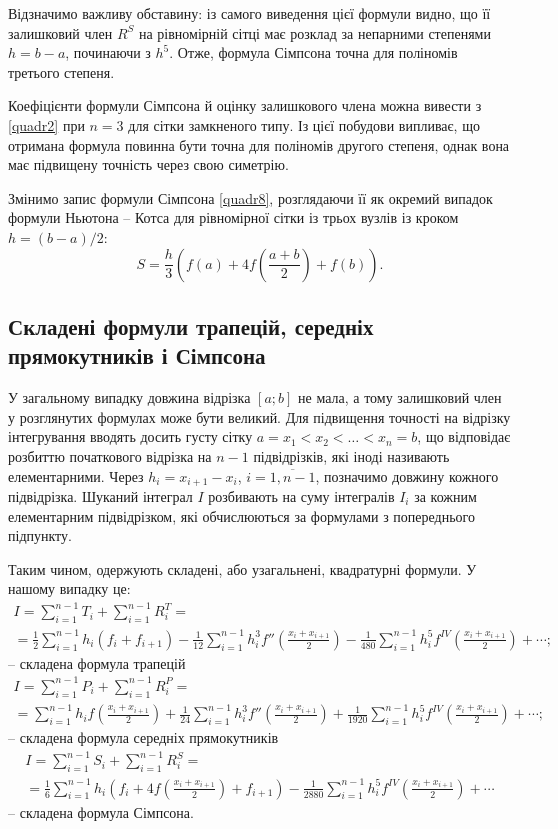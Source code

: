 \documentclass[14pt,twoside]{extreport}
\theoremstyle{mystyle}
\numberwithin{equation}{chapter}
\begin{document}
Відзначимо важливу обставину: із самого виведення цієї формули видно, що її залишковий член $R^S$ на рівномірній сітці має розклад за непарними степенями $h = b - a$, починаючи з $h^5$. Отже, формула Сімпсона точна для поліномів третього степеня.

Коефіцієнти формули Сімпсона й оцінку залишкового члена можна вивести з \eqref{quadr2} при $n = 3$ для сітки замкненого типу. Із цієї побудови випливає, що отримана формула повинна бути точна для поліномів другого степеня, однак вона має підвищену точність через свою симетрію.

Змінимо запис формули Сімпсона \eqref{quadr8}, розглядаючи її як окремий випадок формули Ньютона -- Котса для рівномірної сітки із трьох вузлів із кроком $h = (b - a)/2$:
\[
S=\frac{h}{3}\left(f(a)+4f\left(\frac{a+b}{2}\right)+f(b)\right).
\]

\subsection{Складені формули трапецій, середніх прямокутників і Сімпсона}

У загальному випадку довжина відрізка $[a; b]$ не мала, а тому залишковий член у розглянутих формулах може бути великий. Для підвищення точності на відрізку інтегрування вводять досить густу сітку $a = x_1 < x_2 < \ldots < x_n = b$, що відповідає розбиттю початкового відрізка на $n-1$ підвідрізків, які іноді називають елементарними. Через $h_i = x_{i+1} - x_i$, $i = \overline{1, n-1}$, позначимо довжину кожного підвідрізка. Шуканий інтеграл $I$ розбивають на суму інтегралів $I_i$ за кожним елементарним підвідрізком, які обчислюються за формулами з попереднього підпункту.

Таким чином, одержують складені, або узагальнені, квадратурні формули. У нашому випадку це:
\begin{multline*}
 I=\sum_{i=1}^{n-1}T_{i}+\sum_{i=1}^{n-1}R_{i}^{T}=\\
 =\frac{1}{2}\sum_{i=1}^{n-1}h_{i}(f_{i}+f_{i+1})- \frac{1}{12}\sum_{i=1}^{n-1}h_{i}^{3}f''\left(\frac{x_{i}+x_{i+1}}{2}\right)-\frac{1}{480}\sum_{i=1}^{n-1}h_{i}^{5}f^{IV}\left(\frac{x_{i}+x_{i+1}}{2}\right)+\cdots;
\end{multline*}
-- складена формула трапецій
\begin{multline*}
 I=\sum_{i=1}^{n-1}P_i+\sum_{i=1}^{n-1}R_{i}^{P}=\\
 =\sum_{i=1}^{n-1}h_{i}f\left(\frac{x_{i}+x_{i+1}}{2}\right)+\displaystyle \frac{1}{24}\sum_{i=1}^{n-1}h_{i}^{3}f''\left(\frac{x_{i}+x_{i+1}}{2}\right)+\frac{1}{1920}\sum_{i=1}^{n-1}h_{i}^{5}f^{IV}\left(\frac{x_{i}+x_{i+1}}{2}\right)+\cdots;
\end{multline*}
-- складена формула середніх прямокутників
\begin{multline*}
 I=\displaystyle \sum_{i=1}^{n-1}S_{i}+\sum_{i=1}^{n-1}R_{i}^{S}=\\
 =\frac{1}{6}\sum_{i=1}^{n-1}h_{i}\left(f_{i}+4f\left(\frac{x_{i}+x_{i+1}}{2}\right)+f_{i+1}\right)-\frac{1}{2880}\sum_{i=1}^{n-1}h_{i}^{5}f^{IV}\left(\frac{x_{i}+x_{i+1}}{2}\right)+\cdots
\end{multline*}
-- складена формула Сімпсона.
\end{document}

